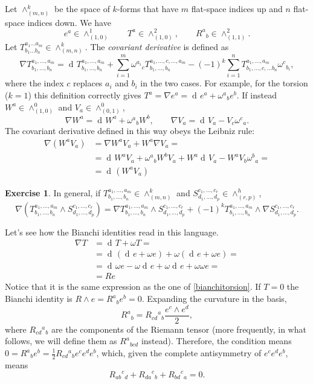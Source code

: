\documentclass[a4paper,12pt]{book}
\newcommand{\dd}{\mathop{\mathrm{d}\!}{}}
\theoremstyle{definition}
\newtheorem{exercise}{Exercise}
\theoremstyle{remark}
\begin{document}
Let $\wedge^k_{(m,n)}$ be the space of $k$-forms that have $m$ flat-space indices up and $n$ flat-space indices down. We have
\[e^a\in\wedge^1_{(1,0)}\qquad T^a\in\wedge^2_{(1,0)},\qquad R^a{}_b\in\wedge^2_{(1,1)}.\]
Let $T^{a_1\ldots a_m}_{b_1\ldots b_n}\in\wedge^k_{(m,n)}$. The \emph{covariant derivative} is defined as
\begin{equation}
\nabla T^{a_1,\ldots, a_m}_{b_1,\ldots, b_n}=\dd T^{a_1,\ldots, a_m}_{b_1,\ldots, b_n}+\sum_{i=1}^m\omega^{a_i}{}_cT^{a_1,\ldots ,c,\ldots, a_m}_{b_1,\ldots, b_n}-(-1)^k\sum_{i=1}^nT^{a_1,\ldots, a_m}_{b_1,\ldots, c,\ldots b_n}\omega^c{}_{b_i},
\label{eqn:covariantderivative}
\end{equation}
where the index $c$ replaces $a_i$ and $b_i$ in the two cases.
For example, for the torsion ($k=1$) this definition correctly gives $T^a=\nabla e^a=\dd e^a+\omega^a{}_be^b$. If instead $W^a\in\wedge^0_{(1,0)}$ and $V_a\in\wedge^0_{(0,1)}$,
\[\nabla W^a=\dd W^a+\omega^a{}_bW^b,\qquad \nabla V_a=\dd V_a-V_c\omega^c{}_a.\]
The covariant derivative defined in this way obeys the Leibniz rule:
\begin{align*}
\nabla(W^aV_a)&=\nabla W^aV_a+W^a\nabla V_a=\\
&=\dd W^aV_a+\omega^a{}_bW^bV_a+W^a\dd V_a-W^aV_b\omega^b{}_a=\\
&=\dd(W^aV_a)\end{align*}

\begin{exercise}
In general, if $T^{a_1,\ldots,a_m}_{b_1,\ldots,b_n}\in\wedge^k_{(m,n)}$ and $S^{c_1,\ldots,c_r}_{d_1,\ldots,d_p}\in\wedge^h_{(r,p)}$,
\[\nabla(T^{a_1,\ldots,a_m}_{b_1,\ldots,b_n}\wedge S^{c_1,\ldots,c_r}_{d_1,\ldots,d_p})=\nabla T^{a_1,\ldots,a_m}_{b_1,\ldots,b_n}\wedge S^{c_1,\ldots,c_r}_{d_1,\ldots,d_p} +(-1)^kT^{a_1,\ldots,a_m}_{b_1,\ldots,b_n}\wedge\nabla S^{c_1,\ldots,c_r}_{d_1,\ldots,d_p}.\]
\end{exercise}

Let's see how the Bianchi identities read in this language.
\begin{align*}
\nabla T&=\dd T+\omega T=\\
&=\dd(\dd e+\omega e)+\omega(\dd e+\omega e)=\\
&=\dd\omega e-\omega\dd e+\omega\dd e+\omega\omega e=\\
&=Re
\end{align*}
Notice that it is the same expression as the one of \cref{bianchitorsion}. If $T=0$ the Bianchi identity is $R\wedge e=R^a{}_be^b=0$. Expanding the curvature in the basis,
\[R^a{}_b=R_{cd}{}^a{}_b\frac{e^c\wedge e^d}{2},\]
where $R_{cd}{}^a{}_b$ are the components of the Riemann tensor (more frequently, in what follows, we will define them as $R^a{}_{bcd}$ instead). Therefore, the condition means $0=R^a{}_be^b=\frac{1}{2}R_{cd}{}^a{}_be^ce^de^b$, which, given the complete antisymmetry of $e^ce^de^b$, means
\[R_{ab}{}^c{}_d+R_{da}{}^c{}_b+R_{bd}{}^c{}_a=0.\]
\end{document}
